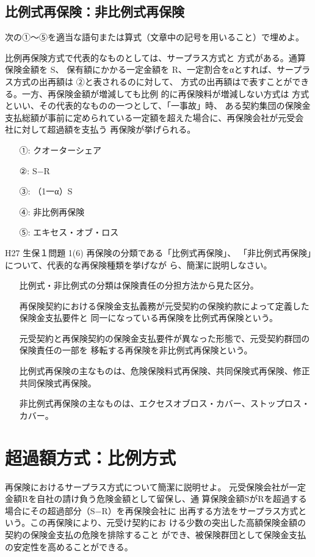 \documentclass[report,gutter=10mm,fore-edge=10mm,uplatex,dvipdfmx]{jlreq}
\begin{document}
\subsection{比例式再保険：非比例式再保険}
次の①～⑤を適当な語句または算式（文章中の記号を用いること）で埋めよ。

比例再保険方式で代表的なものとしては、サープラス方式と
方式がある。通算保険金額を S、
保有額にかかる一定金額を R、一定割合をαとすれば、サープラス方式の出再額は
②と表されるのに対して、
方式の出再額はで表すことができる。一方、再保険金額が増減しても比例
的に再保険料が増減しない方式は
方式といい、その代表的なものの一つとして、「一事故」時、
ある契約集団の保険金支払総額が事前に定められている一定額を超えた場合に、再保険会社が元受会
社に対して超過額を支払う
再保険が挙げられる。
\answer{}
\begin{itemize}
\item[①: ] クオーターシェア
\item[②: ] S−R
\item[③: ] （1一α）S
\item[④: ] 非比例再保険
\item[⑤: ] エキセス・オブ・ロス
\end{itemize}

\problem{}H27 生保１問題 1(6)
再保険の分類である「比例式再保険」、
「非比例式再保険」について、代表的な再保険種類を挙げなが
ら、簡潔に説明しなさい。
\answer{}
\begin{itemize}
\item[] 比例式・非比例式の分類は保険責任の分担方法から見た区分。
\item[] 再保険契約における保険金支払義務が元受契約の保険約款によって定義した保険金支払要件と
同一になっている再保険を比例式再保険という。
\item[] 元受契約と再保険契約の保険金支払要件が異なった形態で、元受契約群団の保険責任の一部を
移転する再保険を非比例式再保険という。
\item[] 比例式再保険の主なものは、危険保険料式再保険、共同保険式再保険、修正共同保険式再保険。
\item[] 非比例式再保険の主なものは、エクセスオブロス・カバー、ストップロス・カバー。
\end{itemize}

\section{超過額方式：比例方式}
再保険におけるサープラス方式について簡潔に説明せよ。
\answer{}
元受保険会社が一定金額Rを自社の請け負う危険金額として留保し、通
算保険金額SがRを超過する場合にその超過部分（S−R）を再保険会社に
出再する方法をサープラス方式という。この再保険により、元受け契約にお
ける少数の突出した高額保険金額の契約の保険金支払の危険を排除すること
ができ、被保険群団として保険金支払の安定性を高めることができる。
\end{document}
